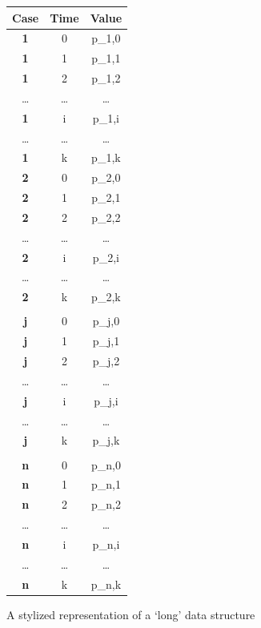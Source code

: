 \documentclass[a4paper,11pt]{book}
\begin{document}
\begin{figure}[!htbp]
	\centering
	\begin{tabular}{|c|c|c|}
		\hline
		\textbf{Case} & \textbf{Time} & \textbf{Value} \\ \hline
		\textbf{1}    & 0 & p_{1,0}  \\
		\textbf{1}    & 1 & p_{1,1}  \\
 		\textbf{1}    & 2 & p_{1,2}  \\
		\ldots & \ldots & \ldots \\
 		\textbf{1}    & i & p_{1,i}  \\
		\ldots & \ldots & \ldots \\
 		\textbf{1}    & k & p_{1,k}  \\ 
		\textbf{2}    & 0 & p_{2,0}  \\
		\textbf{2}    & 1 & p_{2,1}  \\
 		\textbf{2}    & 2 & p_{2,2}  \\
		\ldots & \ldots & \ldots \\
 		\textbf{2}    & i & p_{2,i}  \\
		\ldots & \ldots & \ldots \\
 		\textbf{2}    & k & p_{2,k}  \\ 
		\multicolumn{3}{c}{}\\
		\textbf{j}    & 0 & p_{j,0}  \\
		\textbf{j}    & 1 & p_{j,1}  \\
 		\textbf{j}    & 2 & p_{j,2}  \\
		\ldots & \ldots & \ldots \\
 		\textbf{j}    & i & p_{j,i}  \\
		\ldots & \ldots & \ldots \\
 		\textbf{j}    & k & p_{j,k}  \\ 
		\multicolumn{3}{c}{}\\
		\textbf{n}    & 0 & p_{n,0}  \\
		\textbf{n}    & 1 & p_{n,1}  \\
 		\textbf{n}    & 2 & p_{n,2}  \\
		\ldots & \ldots & \ldots \\
 		\textbf{n}    & i & p_{n,i}  \\
		\ldots & \ldots & \ldots \\
 		\textbf{n}    & k & p_{n,k}  \\ \hline
	\end{tabular}
	\caption{A stylized representation of a `long' data structure}
	\label{fig:long_dataframe}
\end{figure}
\clearpage
\end{document}

